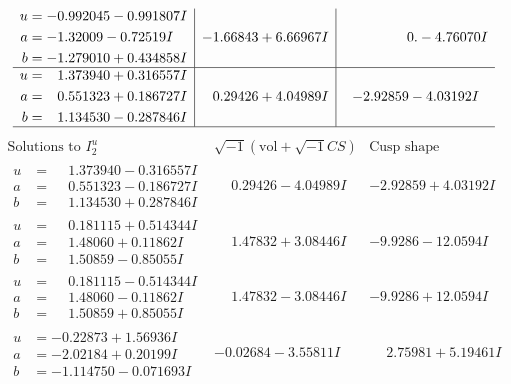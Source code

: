 \documentclass[1p]{elsarticle_modified}
\theoremstyle{definition}
\newcommand{\I}{\sqrt{-1}}
\begin{document}
$$\begin{array}{c|c|c}
\begin{aligned}
u &= -0.992045 - 0.991807 I \\
a &= -1.32009 - 0.72519 I \\
b &= -1.279010 + 0.434858 I\end{aligned}
 & -1.66843 + 6.66967 I & \phantom{-0.000000 } 0. - 4.76070 I \\ \hline\begin{aligned}
u &= \phantom{-}1.373940 + 0.316557 I \\
a &= \phantom{-}0.551323 + 0.186727 I \\
b &= \phantom{-}1.134530 - 0.287846 I\end{aligned}
 & \phantom{-}0.29426 + 4.04989 I & -2.92859 - 4.03192 I\\
 \hline 
 \end{array}$$\newpage$$\begin{array}{c|c|c}  
\text{Solutions to }I^u_{2}& \I (\text{vol} + \sqrt{-1}CS) & \text{Cusp shape}\\
 \hline 
\begin{aligned}
u &= \phantom{-}1.373940 - 0.316557 I \\
a &= \phantom{-}0.551323 - 0.186727 I \\
b &= \phantom{-}1.134530 + 0.287846 I\end{aligned}
 & \phantom{-}0.29426 - 4.04989 I & -2.92859 + 4.03192 I \\ \hline\begin{aligned}
u &= \phantom{-}0.181115 + 0.514344 I \\
a &= \phantom{-}1.48060 + 0.11862 I \\
b &= \phantom{-}1.50859 - 0.85055 I\end{aligned}
 & \phantom{-}1.47832 + 3.08446 I & -9.9286 - 12.0594 I \\ \hline\begin{aligned}
u &= \phantom{-}0.181115 - 0.514344 I \\
a &= \phantom{-}1.48060 - 0.11862 I \\
b &= \phantom{-}1.50859 + 0.85055 I\end{aligned}
 & \phantom{-}1.47832 - 3.08446 I & -9.9286 + 12.0594 I \\ \hline\begin{aligned}
u &= -0.22873 + 1.56936 I \\
a &= -2.02184 + 0.20199 I \\
b &= -1.114750 - 0.071693 I\end{aligned}
 & -0.02684 - 3.55811 I & \phantom{-}2.75981 + 5.19461 I \\ \hline\begin{aligned}

\end{aligned}
\end{array}$$
\end{document}
